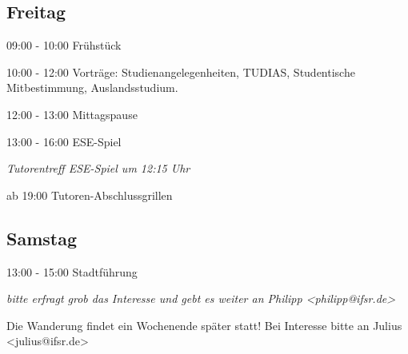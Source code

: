 \documentclass[a4paper,12pt]{report}
\begin{document}
\subsection{Freitag}
\begin{itemize*}
\item 09:00 - 10:00 Frühstück
\item 10:00 - 12:00 Vorträge: Studienangelegenheiten, TUDIAS, Studentische Mitbestimmung, Auslandsstudium.
\item 12:00 - 13:00 Mittagspause
\item 13:00 - 16:00 ESE-Spiel
\begin{itemize*}
  \item \small{\textit{Tutorentreff ESE-Spiel um 12:15 Uhr}}
\end{itemize*}
\item ab 19:00 Tutoren-Abschlussgrillen
\end{itemize*}

\subsection{Samstag}
\begin{itemize*}
\item 13:00 - 15:00 Stadtführung
\begin{itemize*}
  \item \small{\textit{bitte erfragt grob das Interesse und gebt es weiter an Philipp <philipp@ifsr.de>}}
\end{itemize*}
\end{itemize*}

Die Wanderung findet ein Wochenende später statt! Bei Interesse bitte an Julius <julius@ifsr.de>
\end{document}
